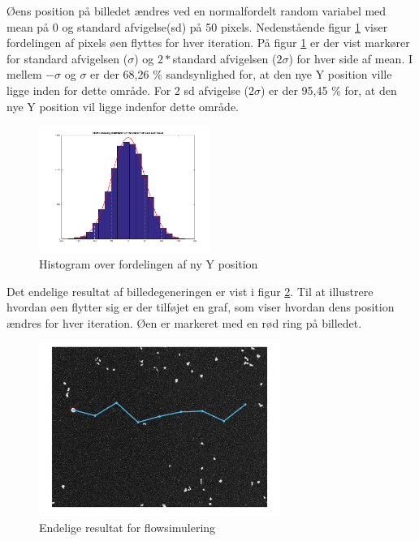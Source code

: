 Øens position på billedet ændres ved en normalfordelt random variabel med mean på 0 og standard afvigelse(sd) på 50 pixels. Nedenstående figur \ref{fig:histfit} viser fordelingen af pixels øen flyttes for hver iteration. På figur \ref{fig:histfit} er der vist markører for standard afvigelsen ($\sigma$) og $2*$standard afvigelsen ($2\sigma$) for hver side af mean. I mellem $-\sigma$ og $\sigma$ er der 68,26 \% sandsynlighed for, at den nye Y position ville ligge inden for dette område. For 2 sd afvigelse ($2\sigma$) er der 95,45 \% for, at den nye Y position vil ligge indenfor dette område.

\begin{figure}[H]
	\centering
	\includegraphics[width=0.5\textwidth]{billeder/software/histfit.png}
	\caption{Histogram over fordelingen af ny Y position}
	\label{fig:histfit}
\end{figure}

Det endelige resultat af billedegeneringen er vist i figur \ref{fig:finalresult}. Til at illustrere hvordan øen flytter sig er der tilføjet en graf, som viser hvordan dens position ændres for hver iteration. Øen er markeret med en rød ring på billedet.

\begin{figure}[H]
	\centering
	\includegraphics[width=0.7\textwidth]{billeder/software/final.png}
	\caption{Endelige resultat for flowsimulering}
	\label{fig:finalresult}
\end{figure}

